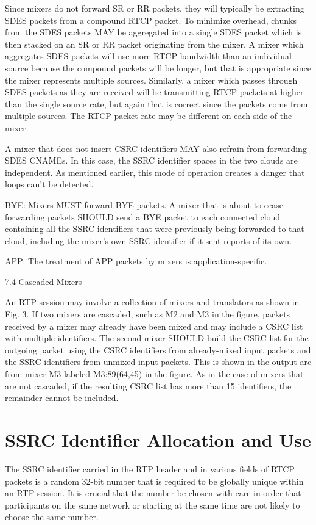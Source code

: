 \documentclass{article}
\begin{document}
Since mixers do not forward SR or RR packets, they will typically be extracting SDES packets from a compound RTCP packet.  To minimize overhead, chunks from the SDES packets MAY be aggregated into a single SDES packet which is then stacked on an SR or RR packet originating from the mixer.  A mixer which aggregates SDES packets will use more RTCP bandwidth than an individual source because the compound packets will be longer, but that is appropriate since the mixer represents multiple sources. Similarly, a mixer which passes through SDES packets as they are received will be transmitting RTCP packets at higher than the single source rate, but again that is correct since the packets come from multiple sources.  The RTCP packet rate may be different on each side of the mixer.

A mixer that does not insert CSRC identifiers MAY also refrain from forwarding SDES CNAMEs.  In this case, the SSRC identifier spaces in the two clouds are independent.  As mentioned earlier, this mode of operation creates a danger that loops can't be detected.

BYE:  Mixers MUST forward BYE packets.  A mixer that is about to cease forwarding packets SHOULD send a BYE packet to each connected cloud containing all the SSRC identifiers that were previously being forwarded to that cloud, including the mixer's own SSRC identifier if it sent reports of its own.

APP:  The treatment of APP packets by mixers is application-specific.

7.4 Cascaded Mixers

An RTP session may involve a collection of mixers and translators as shown in Fig. 3.  If two mixers are cascaded, such as M2 and M3 in the figure, packets received by a mixer may already have been mixed and may include a CSRC list with multiple identifiers.  The second mixer SHOULD build the CSRC list for the outgoing packet using the CSRC identifiers from already-mixed input packets and the SSRC identifiers from unmixed input packets.  This is shown in the output arc from mixer M3 labeled M3:89(64,45) in the figure.  As in the case of mixers that are not cascaded, if the resulting CSRC list has more than 15 identifiers, the remainder cannot be included.

\section{SSRC Identifier Allocation and Use}

The SSRC identifier carried in the RTP header and in various fields of RTCP packets is a random 32-bit number that is required to be globally unique within an RTP session.  It is crucial that the number be chosen with care in order that participants on the same network or starting at the same time are not likely to choose the same number.
\end{document}
